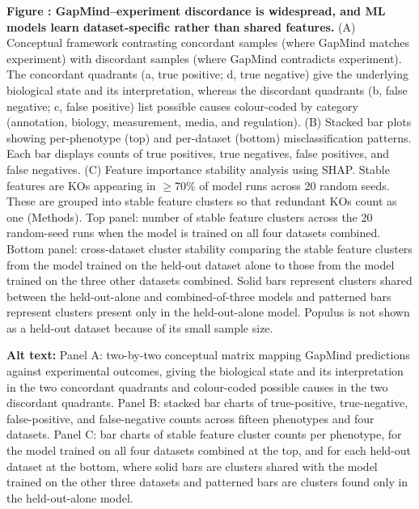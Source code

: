 \label{fig:misclassification_diagnosis}%
\noindent\textbf{Figure : GapMind--experiment discordance is widespread, and ML models learn dataset-specific rather than shared features.}
(A) Conceptual framework contrasting concordant samples (where GapMind matches experiment) with discordant samples (where GapMind contradicts experiment).
The concordant quadrants (a, true positive; d, true negative) give the underlying biological state and its interpretation, whereas the discordant quadrants (b, false negative; c, false positive) list possible causes colour-coded by category (annotation, biology, measurement, media, and regulation).
(B) Stacked bar plots showing per-phenotype (top) and per-dataset (bottom) misclassification patterns.
Each bar displays counts of true positives, true negatives, false positives, and false negatives.
(C) Feature importance stability analysis using SHAP.
Stable features are KOs appearing in $\geq$70\% of model runs across 20 random seeds.
These are grouped into stable feature clusters so that redundant KOs count as one (Methods).
Top panel: number of stable feature clusters across the 20 random-seed runs when the model is trained on all four datasets combined.
Bottom panel: cross-dataset cluster stability comparing the stable feature clusters from the model trained on the held-out dataset alone to those from the model trained on the three other datasets combined.
Solid bars represent clusters shared between the held-out-alone and combined-of-three models and patterned bars represent clusters present only in the held-out-alone model.
Populus is not shown as a held-out dataset because of its small sample size.

\noindent\textbf{Alt text:} Panel A: two-by-two conceptual matrix mapping GapMind predictions against experimental outcomes, giving the biological state and its interpretation in the two concordant quadrants and colour-coded possible causes in the two discordant quadrants. Panel B: stacked bar charts of true-positive, true-negative, false-positive, and false-negative counts across fifteen phenotypes and four datasets. Panel C: bar charts of stable feature cluster counts per phenotype, for the model trained on all four datasets combined at the top, and for each held-out dataset at the bottom, where solid bars are clusters shared with the model trained on the other three datasets and patterned bars are clusters found only in the held-out-alone model.
\par\medskip

